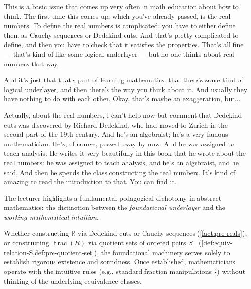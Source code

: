 \begin{speech}[00:03:25 - 00:04:45]
This is a basic issue that comes up very often in math education about how to think. The first time this comes up, which you've already passed, is the real numbers. To define the real numbers is complicated: you have to either define them as Cauchy sequences or Dedekind cuts. And that's pretty complicated to define, and then you have to check that it satisfies the properties. That's all fine --- that's kind of like some logical underlayer --- but no one thinks about real numbers that way.

And it's just that that's part of learning mathematics: that there's some kind of logical underlayer, and then there's the way you think about it. And usually they have nothing to do with each other. Okay, that's maybe an exaggeration, but... 

Actually, about the real numbers, I can't help now but comment that Dedekind cuts was discovered by Richard Dedekind, who had moved to Zurich in the second part of the 19th century. And he's an algebraist; he's a very famous mathematician. He's, of course, passed away by now. And he was assigned to teach analysis. He writes it very beautifully in this book that he wrote about the real numbers: he was assigned to teach analysis, and he's an algebraist, and he said,  And then he spends the class constructing the real numbers. It's kind of amazing to read the introduction to that. You can find it.
\end{speech}

\begin{insight}
The lecturer highlights a fundamental pedagogical dichotomy in abstract mathematics: the distinction between the \emph{foundational underlayer} and the \emph{working mathematical intuition}. 

Whether constructing $\mathbb{R}$ via Dedekind cuts or Cauchy sequences (\cref{fact:pre-reals}), or constructing $\operatorname{Frac}(R)$ via quotient sets of ordered pairs $S_{\equiv}$ (\cref{def:equiv-relation-S,def:pre-quotient-set}), the foundational machinery serves solely to establish rigorous existence and soundness. Once established, mathematicians operate with the intuitive rules (e.g., standard fraction manipulations $\frac{r}{s}$) without thinking of the underlying equivalence classes.
\end{insight}

